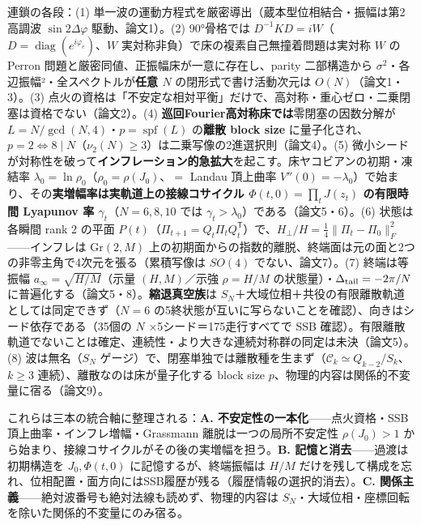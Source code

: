 \documentclass[
  a4paper,
]{ltjsarticle}
\begin{document}
連鎖の各段：(1)
単一波の運動方程式を厳密導出（蔵本型位相結合・振幅は第2高調波
\(\sin2\Delta\varphi\) 駆動、論文1）。(2) 90°骨格では
\(D^{-1}KD=iW\)（\(D=\operatorname{diag}(e^{i\varphi_e})\)、\(W\)
実対称非負）で床の複素自己無撞着問題は実対称 \(W\) の Perron
問題と厳密同値、正振幅床が一意に存在し、parity 二部構造から
\(\sigma^2\)・各辺振幅²・全スペクトルが\textbf{任意 \(N\)}
の閉形式で書け活動次元は \(O(N)\)（論文1・3）。(3)
点火の資格は「不安定な相対平衡」だけで、高対称・重心ゼロ・二乗閉塞は資格でない（論文2）。(4)
\textbf{巡回Fourier高対称床では}零閉塞の因数分解が
\(L=N/\gcd(N,4)\)・\(p=\operatorname{spf}(L)\) の\textbf{離散 block
size}
に量子化され、\(p=2\iff 8\mid N\)（\(\nu_2(N)\ge3\)）は二乗写像の2進選択則（論文4）。(5)
微小シードが対称性を破って\textbf{インフレーション的急拡大}を起こす。床ヤコビアンの初期・凍結率
\(\lambda_0=\ln\rho_0\)（\(\rho_0=\rho(J_0)\)、\(=\) Landau 頂上曲率
\(V''(0)=-\lambda_0\)）で始まり、その\textbf{実増幅率は実軌道上の接線コサイクル
\(\Phi(t,0)=\prod_t J(z_t)\) の有限時間 Lyapunov 率
\(\gamma_t\)}（\(N=6,8,10\) では
\(\gamma_t>\lambda_0\)）である（論文5・6）。(6) 状態は各瞬間 rank 2
の平面
\(P(t)\)（\(\Pi_{t+1}=Q_t\Pi_tQ_t^{\mathsf T}\)）で、\(H_\perp/H=\tfrac14\|\Pi_t-\Pi_0\|_F^2\)------インフレは
\(\mathrm{Gr}(2,M)\)
上の初期面からの指数的離脱、終端面は元の面と2つの非零主角で4次元を張る（累積写像は
\(SO(4)\) でない、論文7）。(7) 終端は等振幅
\(a_\infty=\sqrt{H/M}\)（示量 \((H,M)\)／示強 \(\rho=H/M\)
の状態量）・\(\Delta_{\rm tail}=-2\pi/N\)
に普遍化する（論文5・8）。\textbf{縮退真空族}は
\(S_N\)＋大域位相＋共役の有限離散軌道としては同定できず（\(N=6\)
の5終状態が互いに写らないことを確認）、向きはシード依存である（35個の
\(N\) ×5シード＝175走行すべてで SSB
確認）。有限離散軌道でないことは確定、連続性・より大きな連続対称群の同定は未決（論文5）。(8)
波は無名（\(S_N\)
ゲージ）で、閉塞単独では離散種を生まず（\(\mathcal C_k\simeq Q_{k-2}/S_k\)、\(k\ge3\)
連続）、離散なのは床が量子化する block size
\(p\)、物理的内容は関係的不変量に宿る（論文9）。

これらは三本の統合軸に整理される：\textbf{A.
不安定性の一本化}------点火資格・SSB頂上曲率・インフレ増幅・Grassmann
離脱は一つの局所不安定性 \(\rho(J_0)>1\)
から始まり、接線コサイクルがその後の実増幅を担う。\textbf{B.
記憶と消去}------過渡は初期構造を \(J_0,\Phi(t,0)\)
に記憶するが、終端振幅は \(H/M\)
だけを残して構成を忘れ、位相配置・面方向にはSSB履歴が残る（履歴情報の選択的消去）。\textbf{C.
関係主義}------絶対波番号も絶対法線も読めず、物理的内容は
\(S_N\)・大域位相・座標回転を除いた関係的不変量にのみ宿る。
\end{document}
